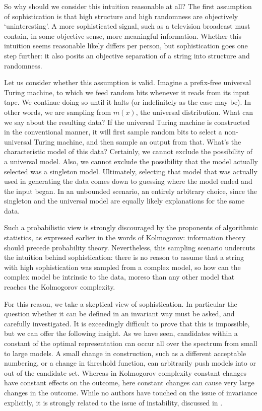 \documentclass{style/llncs}
\begin{document}
So why should we consider this intuition reasonable at all? The first assumption of sophistication is that high structure and high randomness are objectively `uninteresting'. A more sophisticated signal, such as a television broadcast must contain, in some objective sense, more meaningful information. Whether this intuition seems reasonable likely differs per person, but sophistication goes one step further: it also posits an objective separation of a string into structure and randomness.

Let us consider whether this assumption is valid. Imagine a prefix-free universal Turing machine, to which we feed random bits whenever it reads from its input tape. We continue doing so until it halts (or indefinitely as the case may be). In other words, we are sampling from $m(x)$, the universal distribution. What can we say about the resulting data? If the universal Turing machine is constructed in the conventional manner, it will first sample random bits to select a non-universal Turing machine, and then sample an output from that. What's the characteristic model of this data? Certainly, we cannot exclude the possibility of a universal model. Also, we cannot exclude the possibility that the model actually selected was a singleton model. Ultimately, selecting that model that was actually used in generating the data comes down to guessing where the model ended and the input began. In an unbounded scenario, an entirely arbitrary choice, since the singleton and the universal model are equally likely explanations for the same data.

Such a probabilistic view is strongly discouraged by the proponents of algorithmic statistics, as expressed earlier in the words of Kolmogorov: information theory should precede probability theory. Nevertheless, this sampling scenario undercuts the intuition behind sophistication: there is no reason to assume that a string with high sophistication was sampled from a complex model, so how can the complex model be intrinsic to the data, moreso than any other model that reaches the Kolmogorov complexity.

For this reason, we take a skeptical view of sophistication. In particular the question whether it can be defined in an invariant way must be asked, and carefully investigated. It is exceedingly difficult to prove that this is impossible, but we can offer the following insight. As we have seen, candidates within a constant of the optimal representation can occur all over the spectrum from small to large models. A small change in construction, such as a different acceptable numbering, or a change in threshold function, can arbitrarily push models into or out of the candidate set. Whereas in Kolmogorov complexity constant changes have constant effects on the outcome, here constant changes can cause very large changes in the outcome. While no authors have touched on the issue of invariance explicitly, it is strongly related to the issue of instability, discussed in \cite{antunes2013sophistication,vereshchagin2013algorithmic}.
\end{document}
